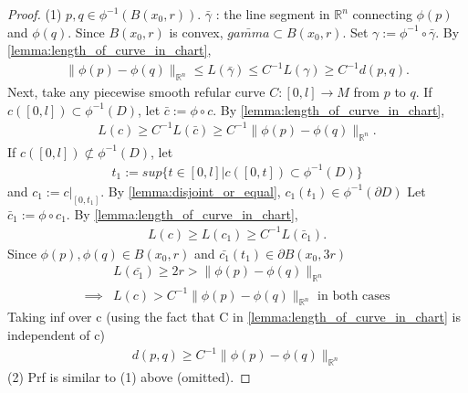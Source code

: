 \begin{proof}
    (1) $p,q \in \phi^{-1}({B}(x_0, r))$. $\bar{\gamma}$ : the line segment in $\mathbb{R}^n$ connecting $\phi(p)$ and $\phi(q)$. 
    Since $B(x_0, r)$ is convex, $\bar{gamma} \subset B(x_0, r)$. Set $\gamma := \phi^{-1} \circ \bar{\gamma}$.
    By \autoref{lemma:length_of_curve_in_chart},
    \[
    \begin{aligned}
        \|\phi(p) - \phi(q) \|_{\mathbb{R}^n} \leq L(\bar{\gamma}) \leq C^{-1} L(\gamma) \geq C^{-1} d(p,q).
    \end{aligned}
    \]
    Next, take any piecewise smooth refular curve $C: [0,l] \to M$ from $p$ to $q$. 
    If $c([0,l]) \subset \phi^{-1}(D)$, let $\bar{c} := \phi \circ c$. By \autoref{lemma:length_of_curve_in_chart},
    \[
    \begin{aligned}
        L(c) \geq C^{-1} L(\bar{c}) \geq C^{-1} \|\phi(p) - \phi(q)\|_{\mathbb{R}^n}.
    \end{aligned}
    \]
    If $c([0,l]) \not\subset \phi^{-1}(D)$, let
    \[
    \begin{aligned}
        t_1 := sup \{t\in [0,l] | c([0,t]) \subset \phi^{-1}(D)\}
    \end{aligned}
    \]
    and $c_1 := c|_{[0,t_1]}$. By \autoref{lemma:disjoint_or_equal}, $c_1(t_1) \in \phi^{-1}(\partial D)$
    Let $\bar{c}_1 := \phi \circ c_1$. By \autoref{lemma:length_of_curve_in_chart},
    \[
    \begin{aligned}
        L(c) \geq L(c_1) \geq C^{-1} L(\bar{c}_1).
    \end{aligned}
    \]
    Since $\phi(p), \phi(q) \in B(x_0, r )$ and $\bar{c_1}(t_1) \in \partial B(x_0, 3r)$
    \[
    \begin{aligned}
        &L(\bar{c_1}) \geq 2r > \|\phi(p)-\phi(q)\|_{\mathbb{R}^n} \\
       \implies &L(c) > C^{-1} \|\phi(p) - \phi(q)\|_{\mathbb{R}^n} \text{ in both cases}
    \end{aligned}\]
    Taking inf over c (using the fact that C in \autoref{lemma:length_of_curve_in_chart} is independent of c)
    \[
    \begin{aligned}
        d(p,q) \geq C^{-1} \|\phi(p) - \phi(q) \|_{\mathbb{R}^n}
    \end{aligned}
    \]
    (2) Prf is similar to (1) above (omitted).
\end{proof}

